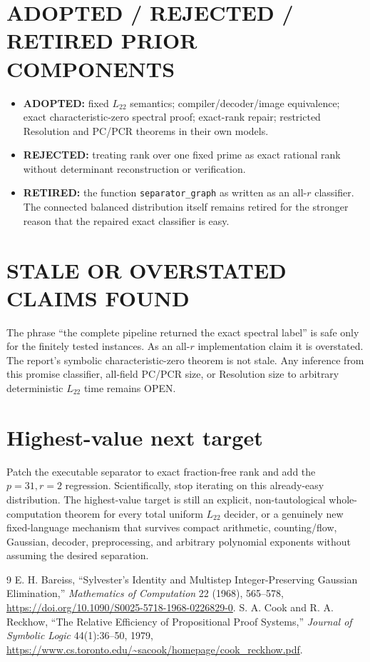 \documentclass[11pt]{article}
\newcommand{\Ltwo}{L_{22}}
\begin{document}
\section{ADOPTED / REJECTED / RETIRED PRIOR COMPONENTS}
\begin{itemize}
\item \textbf{ADOPTED:} fixed $\Ltwo$ semantics; compiler/decoder/image
  equivalence; exact characteristic-zero spectral proof; exact-rank repair;
  restricted Resolution and PC/PCR theorems in their own models.
\item \textbf{REJECTED:} treating rank over one fixed prime as exact rational
  rank without determinant reconstruction or verification.
\item \textbf{RETIRED:} the function \texttt{separator\_graph} as written as
  an all-$r$ classifier.  The connected balanced distribution itself remains
  retired for the stronger reason that the repaired exact classifier is easy.
\end{itemize}

\section{STALE OR OVERSTATED CLAIMS FOUND}
The phrase ``the complete pipeline returned the exact spectral label'' is safe
only for the finitely tested instances.  As an all-$r$ implementation claim it
is overstated.  The report's symbolic characteristic-zero theorem is not
stale.  Any inference from this promise classifier, all-field PC/PCR size, or
Resolution size to arbitrary deterministic $\Ltwo$ time remains OPEN.

\section{Highest-value next target}
Patch the executable separator to exact fraction-free rank and add the
$p=31,r=2$ regression.  Scientifically, stop iterating on this already-easy
distribution.  The highest-value target is still an explicit, non-tautological
whole-computation theorem for every total uniform $\Ltwo$ decider, or a
genuinely new fixed-language mechanism that survives compact arithmetic,
counting/flow, Gaussian, decoder, preprocessing, and arbitrary polynomial
exponents without assuming the desired separation.

\begin{thebibliography}{9}
E. H. Bareiss,
``Sylvester's Identity and Multistep Integer-Preserving Gaussian
Elimination,'' \emph{Mathematics of Computation} 22 (1968), 565--578,
\url{https://doi.org/10.1090/S0025-5718-1968-0226829-0}.
S. A. Cook and R. A. Reckhow,
``The Relative Efficiency of Propositional Proof Systems,''
\emph{Journal of Symbolic Logic} 44(1):36--50, 1979,
\url{https://www.cs.toronto.edu/~sacook/homepage/cook_reckhow.pdf}.
\end{thebibliography}
\end{document}
